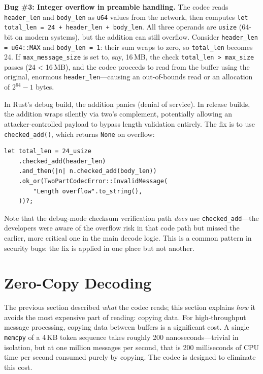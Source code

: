 \begin{bugbox}
\textbf{Bug \#3: Integer overflow in preamble handling.} The codec reads \texttt{header\_len} and \texttt{body\_len} as \texttt{u64} values from the network, then computes \texttt{let total\_len = 24 + header\_len + body\_len}. All three operands are \texttt{usize} (64-bit on modern systems), but the addition can still overflow. Consider \texttt{header\_len = u64::MAX} and \texttt{body\_len = 1}: their sum wraps to zero, so \texttt{total\_len} becomes 24. If \texttt{max\_message\_size} is set to, say, 16\,MB, the check \texttt{total\_len > max\_size} passes (24 < 16\,MB), and the codec proceeds to read from the buffer using the original, enormous \texttt{header\_len}---causing an out-of-bounds read or an allocation of $2^{64} - 1$ bytes.

In Rust's debug build, the addition panics (denial of service). In release builds, the addition wraps silently via two's complement, potentially allowing an attacker-controlled payload to bypass length validation entirely. The fix is to use \texttt{checked\_add()}, which returns \texttt{None} on overflow:

\begin{verbatim}
let total_len = 24_usize
    .checked_add(header_len)
    .and_then(|n| n.checked_add(body_len))
    .ok_or(TwoPartCodecError::InvalidMessage(
        "Length overflow".to_string(),
    ))?;
\end{verbatim}

Note that the debug-mode checksum verification path \emph{does} use \texttt{checked\_add}---the developers were aware of the overflow risk in that code path but missed the earlier, more critical one in the main decode logic. This is a common pattern in security bugs: the fix is applied in one place but not another.
\end{bugbox}

\section{Zero-Copy Decoding}
\label{sec:codecs:zerocopy}

%
The previous section described \emph{what} the codec reads; this section explains \emph{how} it avoids the most expensive part of reading: copying data. For high-throughput message processing, copying data between buffers is a significant cost. A single \texttt{memcpy} of a 4\,KB token sequence takes roughly 200 nanoseconds---trivial in isolation, but at one million messages per second, that is 200 milliseconds of CPU time per second consumed purely by copying. The codec is designed to eliminate this cost.

